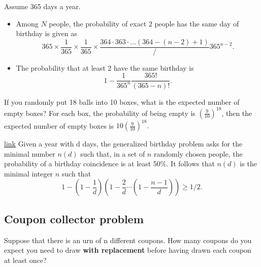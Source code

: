 \begin{refsection}
\begin{example}
	Assume 365 days a year. \begin{itemize}
		\item Among $N$ people, the probability of exact $2$ people has the same day of birthday is given as
		$$365\times \frac{1}{365}\times \frac{1}{365}\times \frac{ 364 \cdot 363\cdot \dots (364-(n-2)+1)}/{365^{n-2}}.$$
		\item The probability that at least 2 have the same birthday is 
		$$1 - \frac{1}{365^n}\frac{365!}{(365-n)!}.$$
	\end{itemize} 
\end{example}

\begin{example}
If you randomly put 18 balls into 10 boxes, what is the expected number of empty boxes?
For each box, the probability of being empty is $(\frac{9}{10})^18$, then the expected number of empty boxes is $10(\frac{9}{10})^18.$
\end{example}


\begin{lemma}\href{https://en.wikipedia.org/wiki/Birthday_problem#The_generalized_birthday_problem}{link}
Given a year with d days, the generalized birthday problem asks for the minimal number $n(d)$ such that, in a set of $n$ randomly chosen people, the probability of a birthday coincidence is at least 50\%.
It follows that $n(d)$ is the minimal integer $n$ such that
$$1 - (1- \frac{1}{d})(1 - \frac{2}{d}\cdots (1 - \frac{n-1}{d}))\geq 1/2.$$
 	
\end{lemma}


\subsection{Coupon collector problem}
\begin{definition}
Suppose that there is an urn of n different coupons. How many coupons do you expect you need to draw \textbf{with replacement} before having drawn each coupon at least once? 
\end{definition}


\end{refsection}
